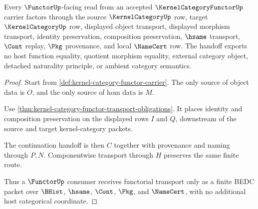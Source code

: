 \begin{theorem}
\label{thm:kernel-category-functor-carrier-continuation-handoff}
Every $\FunctorUp$-facing read from an accepted $\KernelCategoryFunctorUp$ carrier factors through the source $\KernelCategoryUp$ row, target $\KernelCategoryUp$ row, displayed object transport, displayed morphism transport, identity preservation, composition preservation, $\hsame$ transport, $\Cont$ replay, $\Pkg$ provenance, and local $\NameCert$ row. The handoff exports no host function equality, quotient morphism equality, external category object, detached naturality principle, or ambient category semantics.
\end{theorem}
\begin{proof}
Start from \autoref{def:kernel-category-functor-carrier}. The only source of object data is $O$, and the only source of hom data is $M$.

Use \autoref{thm:kernel-category-functor-transport-obligations}. It places identity and composition preservation on the displayed rows $I$ and $Q$, downstream of the source and target kernel-category packets.

The continuation handoff is then $C$ together with provenance and naming through $P,N$. Componentwise transport through $H$ preserves the same finite route.

Thus a $\FunctorUp$ consumer receives functorial transport only as a finite BEDC packet over $\BHist$, $\hsame$, $\Cont$, $\Pkg$, and $\NameCert$, with no additional host categorical coordinate.
\end{proof}

